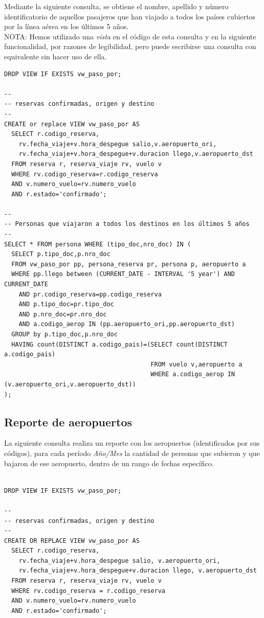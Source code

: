 \documentclass[a4paper,10pt]{article}
\begin{document}
Mediante la siguiente consulta, se obtiene el nombre, apellido y número identificatorio de aquellos pasajeros que han viajado a todos los países cubiertos por la línea aérea en los
últimos 5 años.\\

NOTA: Hemos utilizado una \textit{vista} en el código de esta consulta y en la siguiente funcionalidad, por razones de legibilidad, pero puede escribirse una consulta con equivalente sin hacer uso de ella.


\begin{verbatim}
DROP VIEW IF EXISTS vw_paso_por;

--
-- reservas confirmadas, origen y destino
--
CREATE or replace VIEW vw_paso_por AS
  SELECT r.codigo_reserva,
    rv.fecha_viaje+v.hora_despegue salio,v.aeropuerto_ori,
    rv.fecha_viaje+v.hora_despegue+v.duracion llego,v.aeropuerto_dst
  FROM reserva r, reserva_viaje rv, vuelo v
  WHERE rv.codigo_reserva=r.codigo_reserva
  AND v.numero_vuelo=rv.numero_vuelo
  AND r.estado='confirmado';

--
-- Personas que viajaron a todos los destinos en los últimos 5 años
--
SELECT * FROM persona WHERE (tipo_doc,nro_doc) IN (
  SELECT p.tipo_doc,p.nro_doc
  FROM vw_paso_por pp, persona_reserva pr, persona p, aeropuerto a
  WHERE pp.llego between (CURRENT_DATE - INTERVAL '5 year') AND CURRENT_DATE
    AND pr.codigo_reserva=pp.codigo_reserva
    AND p.tipo_doc=pr.tipo_doc
    AND p.nro_doc=pr.nro_doc
    AND a.codigo_aerop IN (pp.aeropuerto_ori,pp.aeropuerto_dst)
  GROUP by p.tipo_doc,p.nro_doc
  HAVING count(DISTINCT a.codigo_pais)=(SELECT count(DISTINCT a.codigo_pais)
                                        FROM vuelo v,aeropuerto a
                                        WHERE a.codigo_aerop IN (v.aeropuerto_ori,v.aeropuerto_dst))
);
\end{verbatim}


\subsection{Reporte de aeropuertos}

La siguiente consulta realiza un reporte con los aeropuertos (identificados por sus códigos), para cada período \textit{Año/Mes} la cantidad de personas que subieron y que bajaron de ese aeropuerto,
dentro de un rango de fechas específico.

\begin{verbatim}
 
DROP VIEW IF EXISTS vw_paso_por;

--
-- reservas confirmadas, origen y destino
--
CREATE OR REPLACE VIEW vw_paso_por AS
  SELECT r.codigo_reserva,
    rv.fecha_viaje+v.hora_despegue salio, v.aeropuerto_ori,
    rv.fecha_viaje+v.hora_despegue+v.duracion llego, v.aeropuerto_dst
  FROM reserva r, reserva_viaje rv, vuelo v
  WHERE rv.codigo_reserva = r.codigo_reserva
  AND v.numero_vuelo=rv.numero_vuelo
  AND r.estado='confirmado';
  
\end{verbatim}
\end{document}
